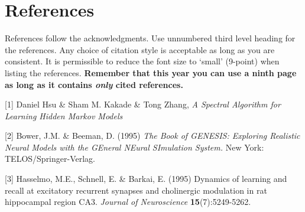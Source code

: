 \documentclass{article} %
\begin{document}
\section*{References}

References follow the acknowledgments. Use unnumbered third level heading for
the references. Any choice of citation style is acceptable as long as you are
consistent. It is permissible to reduce the font size to `small' (9-point) 
when listing the references. {\bf Remember that this year you can use
a ninth page as long as it contains \emph{only} cited references.}

\small{
[1] Daniel Hsu \& Sham M. Kakade \& Tong Zhang, {\it A Spectral Algorithm for Learning Hidden Markov Models}

[2] Bower, J.M. \& Beeman, D. (1995) {\it The Book of GENESIS: Exploring
Realistic Neural Models with the GEneral NEural SImulation System.}
New York: TELOS/Springer-Verlag.

[3] Hasselmo, M.E., Schnell, E. \& Barkai, E. (1995) Dynamics of learning
and recall at excitatory recurrent synapses and cholinergic modulation
in rat hippocampal region CA3. {\it Journal of Neuroscience}
{\bf 15}(7):5249-5262.
}
\end{document}
